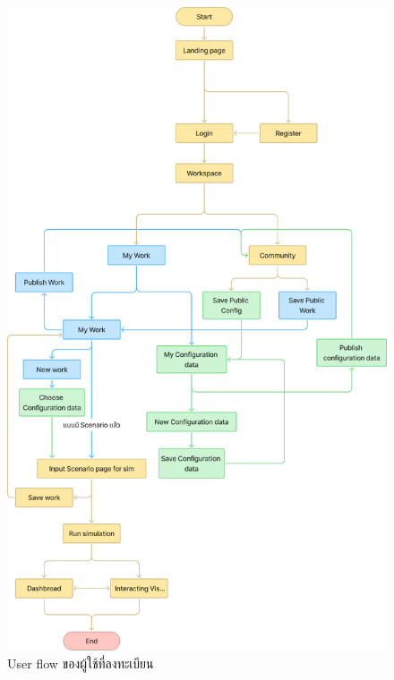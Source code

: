     \begin{figure}
      \centering
      \includegraphics[width=\textwidth,height=0.95\textheight,keepaspectratio]{User_flow_-_login.png}
      \caption{User flow ของผู้ใช้ที่ลงทะเบียน}
      \label{fig:UserFlowRegistered}
    \end{figure}
      
\newpage

